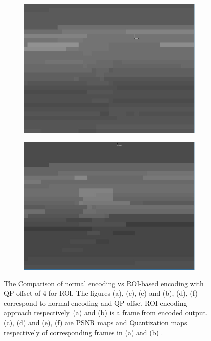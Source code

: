 \documentclass[11pt]{article} %
\begin{document}
\begin{figure}
\begin{subfigure}[t]{0.45\textwidth}
		\includegraphics[width=\textwidth]{PaulDefault120_91250kbps_quant}
		\caption{}
	\label{fig:QP Offset Quant comparison 1}
	\end{subfigure}
	\begin{subfigure}[t]{0.45\textwidth}
		\centering
		\includegraphics[width=\textwidth]{QPOffset/paul120_250kbps_QPoffset4_quant}
		\caption{}
		\label {fig:QP Offset Quant comparison 2}
	\end{subfigure}
	\caption{The Comparison of normal encoding vs ROI-based encoding with QP offset of 4 for ROI. The figures (a), (c), (e) and  (b), (d), (f) correspond to normal encoding and QP offset ROI-encoding approach respectively. (a) and (b) is a frame from encoded output. (c), (d) and (e), (f) are PSNR maps and Quantization maps respectively of corresponding frames in (a) and (b) .}
	\label{fig:Default_QPOffsetCompare}
\end{figure}
\end{document}
